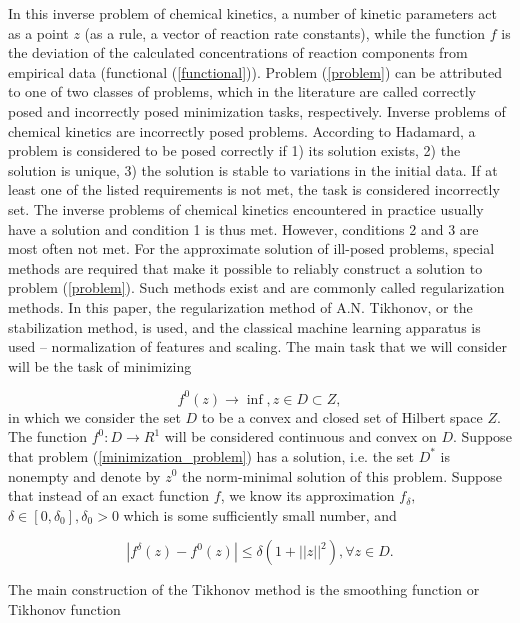 \documentclass{svproc}
\begin{document}
In this inverse problem of chemical kinetics, a number of kinetic parameters act as a point $z$ (as a rule, a vector of reaction rate constants), while the function $f$ is the deviation of the calculated concentrations of reaction components from empirical data (functional (\ref{functional})).
Problem (\ref{problem}) can be attributed to one of two classes of problems, which in the literature are called correctly posed and incorrectly posed minimization tasks, respectively. Inverse problems of chemical kinetics are incorrectly posed problems. According to Hadamard, a problem is considered to be posed correctly if 1) its solution exists, 2) the solution is unique, 3) the solution is stable to variations in the initial data. If at least one of the listed requirements is not met, the task is considered incorrectly set. The inverse problems of chemical kinetics encountered in practice usually have a solution and condition 1 is thus met. However, conditions 2 and 3 are most often not met\cite{regularization}.
For the approximate solution of ill-posed problems, special methods are required that make it possible to reliably construct a solution to problem (\ref{problem}). Such methods exist and are commonly called regularization methods. In this paper, the regularization method of A.N. Tikhonov, or the stabilization method, is used, and the classical machine learning apparatus is used – normalization of features and scaling.
The main task that we will consider will be the task of minimizing

\begin{equation}
f^0(z) \rightarrow \inf, z \in D \subset Z,
\label{minimization_problem}
\end{equation}
in which we consider the set $D$ to be a convex and closed set of Hilbert space $Z$. The function $f^0:D \rightarrow R^1$ will be considered continuous and convex on $D$. Suppose that problem (\ref{minimization_problem}) has a solution, i.e. the set $D^*$ is nonempty and denote by $z^0$ the norm-minimal solution of this problem. Suppose that instead of an exact function $f$, we know its approximation $f_{\delta},$ $\delta \in [0, \delta_0], \delta_0>0$ which is some sufficiently small number, and

\begin{equation}
|f^\delta(z) - f^0(z)| \leq \delta (1+||z||^2),  \forall z \in D. 
\end{equation}

The main construction of the Tikhonov method is the smoothing function or Tikhonov function
\end{document}
